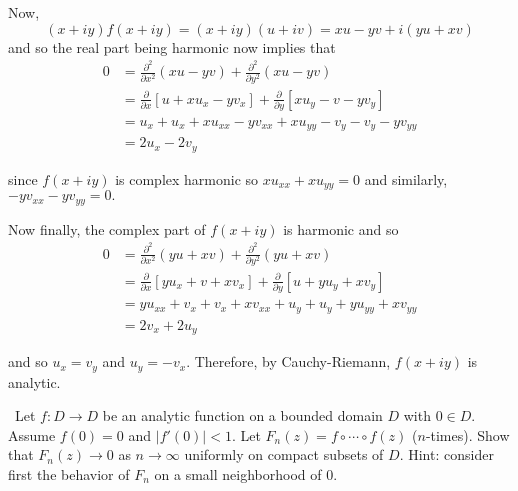 \documentclass[12pt]{Homework}
\begin{document}
\begin{solution}
\begin{enumerate}[label=(\alph*)]
     Now, $$(x+iy)f(x+iy)=(x+iy)(u+iv)=xu-yv+i(yu+xv)$$ and so the real part being harmonic now implies that \begin{align*}
        0&=\frac{\partial^2}{\partial x^2}(xu-yv)+\frac{\partial^2}{\partial y^2}(xu-yv)\\
        &=\frac{\partial}{\partial x}\left[u+xu_x-yv_x\right]+\frac{\partial}{\partial y}\left[xu_y-v-yv_y\right]\\
        &=u_x+u_x+xu_{xx}-yv_{xx}+xu_{yy}-v_y-v_y-yv_{yy}\\
        &=2u_x-2v_y
    \end{align*}
    
    since $f(x+iy)$ is complex harmonic so $xu_{xx}+xu_{yy}=0$ and similarly, $-yv_{xx}-yv_{yy}=0.$
    
    Now finally, the complex part of $f(x+iy)$ is harmonic and so \begin{align*}
        0&=\frac{\partial^2}{\partial x^2}(yu+xv)+\frac{\partial^2}{\partial y^2}(yu+xv)\\
        &=\frac{\partial}{\partial x}\left[yu_x+v+xv_x\right]+\frac{\partial}{\partial y}\left[u+yu_y+xv_y\right]\\
        &=yu_{xx}+v_x+v_x+xv_{xx}+u_y+u_y+yu_{yy}+xv_{yy}\\
        &=2v_x+2u_y
    \end{align*}
    
    and so $u_x=v_y$ and $u_y=-v_x$. Therefore, by Cauchy-Riemann, $f(x+iy)$ is analytic.
\end{enumerate}
\end{solution}
\newpage

\begin{problem} $\,$
Let $f:D\to D$ be an analytic function on a bounded domain $D$ with $0\in D$. Assume $f(0)=0$ and $|f'(0)|<1$. Let $F_n(z)=f\circ \cdots\circ f(z)$ ($n$-times). Show that $F_n(z)\to0$ as $n\to\infty$ uniformly on compact subsets of $D$. Hint: consider first the behavior of $F_n$ on a small neighborhood of $0.$
\end{problem}
\end{document}
